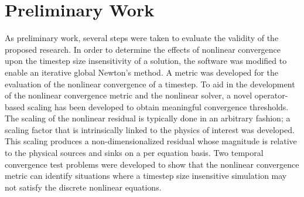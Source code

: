 \chapter{Preliminary Work}
\label{chap:prelim_work}
As preliminary work, several steps were taken to evaluate the validity of the proposed research.
In order to determine the effects of nonlinear convergence upon the timestep size insensitivity of a solution, the \cobra{} software was modified to enable an iterative global Newton's method.
A metric was developed for the evaluation of the nonlinear convergence of a timestep.
To aid in the development of the nonlinear convergence metric and the nonlinear solver, a novel operator-based scaling has been developed to obtain meaningful convergence thresholds.
The scaling of the nonlinear residual is typically done in an arbitrary fashion; a scaling factor that is intrinsically linked to the physics of interest was developed.
This scaling produces a non-dimensionalized residual whose magnitude is relative to the physical sources and sinks on a per equation basis. 
Two temporal convergence test problems were developed to show that the nonlinear convergence metric can identify situations where a timestep size insensitive simulation may not satisfy the discrete nonlinear equations.
